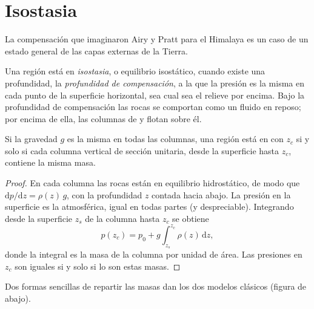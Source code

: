 \section{Isostasia}

La compensación que imaginaron Airy y Pratt para el Himalaya es un caso de un estado general de las capas externas de la Tierra.

\begin{definition}\label{def:b1:isostasy-gravity:isostasy}
Una región está en \emph{isostasia}, o equilibrio isostático, cuando existe una profundidad, la \emph{profundidad de
compensación}, a la que la presión es la misma en cada punto de la superficie horizontal, sea cual
sea el relieve por encima. Bajo la profundidad de compensación las rocas se comportan como un fluido en reposo; por encima de ella, las
columnas de  y  flotan sobre él.
\end{definition}

\begin{proposition}\label{prop:b1:isostasy-gravity:equal-mass}
Si la gravedad $g$ es la misma en todas las columnas, una región está en  con  $z_c$ si y solo
si cada columna vertical de sección unitaria, desde la superficie hasta $z_c$, contiene la misma masa.
\end{proposition}

\begin{proof}
En cada columna las rocas están en equilibrio hidrostático, de modo que $\mathrm dp/\mathrm dz = \rho(z)\,g$, con la profundidad $z$
contada hacia abajo. La presión en la superficie es la atmosférica, igual en todas partes (y despreciable). Integrando desde la
superficie $z_s$ de la columna hasta $z_c$ se obtiene
\[
  p(z_c) = p_0 + g\int_{z_s}^{z_c}\rho(z)\,\mathrm dz ,
\]
donde la integral es la masa de la columna por unidad de área. Las presiones en $z_c$ son iguales si y solo si lo son estas masas.
\end{proof}

Dos formas sencillas de repartir las masas dan los dos modelos clásicos (figura de abajo).

